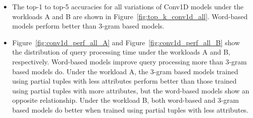 \documentclass[conference]{IEEEtran}
\begin{document}
\begin{itemize}
	\item The top-1 to top-5 accuracies for all variations of Conv1D models under the workloads A and B are shown in Figure~\ref{fig:top_k_conv1d_all}. 
	Word-based models perform better than 3-gram based models.
	\item Figure~\ref{fig:conv1d_perf_all_A} and Figure~\ref{fig:conv1d_perf_all_B} show the distribution of query processing time under the workloads A and B, respectively. 
	Word-based models improve query processing more than 3-gram based models do. 
	Under the workload A, the 3-gram based models trained using partial tuples with less attributes perform better than those trained using partial tuples with more attributes, but the word-based models show an opposite relationship.
	Under the workload B, both word-based and 3-gram based models do better when trained using partial tuples with less attributes.
\end{itemize}
\end{document}
